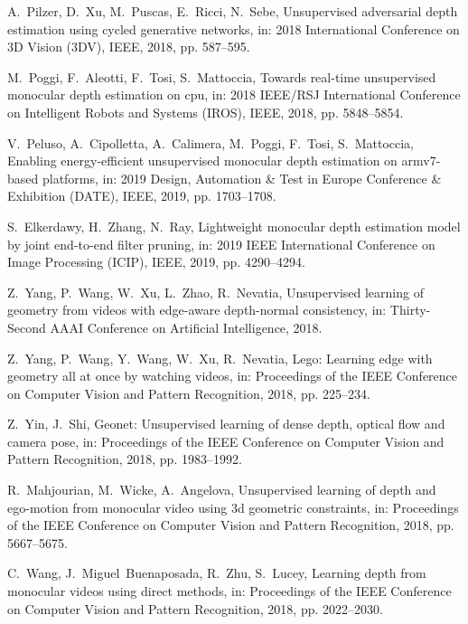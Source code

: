 \documentclass[5p]{elsarticle}
\begin{document}
\begin{thebibliography}{100}
A.~Pilzer, D.~Xu, M.~Puscas, E.~Ricci, N.~Sebe, Unsupervised adversarial depth
  estimation using cycled generative networks, in: 2018 International
  Conference on 3D Vision (3DV), IEEE, 2018, pp. 587--595.

M.~Poggi, F.~Aleotti, F.~Tosi, S.~Mattoccia, Towards real-time unsupervised
  monocular depth estimation on cpu, in: 2018 IEEE/RSJ International Conference
  on Intelligent Robots and Systems (IROS), IEEE, 2018, pp. 5848--5854.

V.~Peluso, A.~Cipolletta, A.~Calimera, M.~Poggi, F.~Tosi, S.~Mattoccia,
  Enabling energy-efficient unsupervised monocular depth estimation on
  armv7-based platforms, in: 2019 Design, Automation \& Test in Europe
  Conference \& Exhibition (DATE), IEEE, 2019, pp. 1703--1708.

S.~Elkerdawy, H.~Zhang, N.~Ray, Lightweight monocular depth estimation model by
  joint end-to-end filter pruning, in: 2019 IEEE International Conference on
  Image Processing (ICIP), IEEE, 2019, pp. 4290--4294.

Z.~Yang, P.~Wang, W.~Xu, L.~Zhao, R.~Nevatia, Unsupervised learning of geometry
  from videos with edge-aware depth-normal consistency, in: Thirty-Second AAAI
  Conference on Artificial Intelligence, 2018.

Z.~Yang, P.~Wang, Y.~Wang, W.~Xu, R.~Nevatia, Lego: Learning edge with geometry
  all at once by watching videos, in: Proceedings of the IEEE Conference on
  Computer Vision and Pattern Recognition, 2018, pp. 225--234.

Z.~Yin, J.~Shi, Geonet: Unsupervised learning of dense depth, optical flow and
  camera pose, in: Proceedings of the IEEE Conference on Computer Vision and
  Pattern Recognition, 2018, pp. 1983--1992.

R.~Mahjourian, M.~Wicke, A.~Angelova, Unsupervised learning of depth and
  ego-motion from monocular video using 3d geometric constraints, in:
  Proceedings of the IEEE Conference on Computer Vision and Pattern
  Recognition, 2018, pp. 5667--5675.

C.~Wang, J.~Miguel~Buenaposada, R.~Zhu, S.~Lucey, Learning depth from monocular
  videos using direct methods, in: Proceedings of the IEEE Conference on
  Computer Vision and Pattern Recognition, 2018, pp. 2022--2030.


\end{thebibliography}
\end{document}
